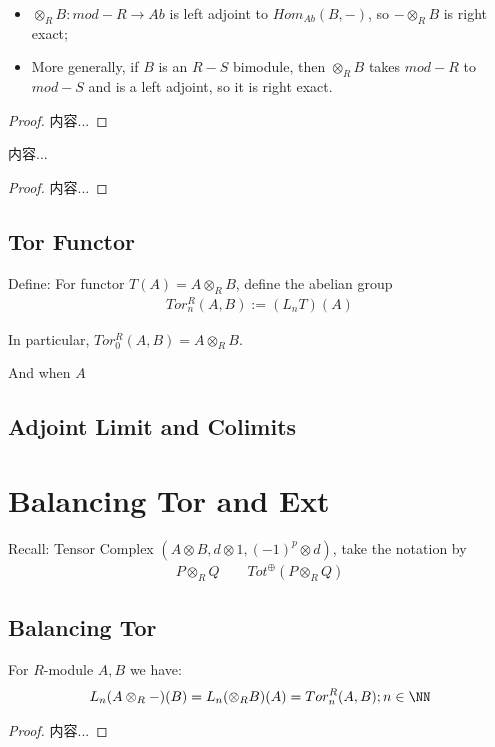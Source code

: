 \documentclass[Total.tex]{subfiles}
\begin{document}
			\begin{corollary}
				\begin{itemize}
				\item $\otimes_R B:mod-R\rightarrow Ab$ is left adjoint to $Hom_{Ab}(B,-)$, so $-\otimes_R B$ is right exact;
				\item More generally, if $B$ is an $R-S$ bimodule, then $\otimes_RB$ takes $mod-R$ to $mod-S$ and is a left adjoint, so it is right exact.
				\end{itemize}
			\end{corollary}
			\begin{proof}
				内容...
			\end{proof}
			
			\begin{proposition}
				内容...
			\end{proposition}
			\begin{proof}
				内容...
			\end{proof}
			\subsection{Tor Functor}
			\begin{Def}
				Define: For functor $T(A)=A\otimes_R B$, define the abelian group
				\begin{gather*}
					Tor^R_n(A,B):=(L_n T)(A)
				\end{gather*}
				
				In particular, $Tor_0^R(A,B)=A\otimes_R B$. 
				
				And when $A$
			\end{Def}
			\subsection{Adjoint Limit and Colimits}
		\section{Balancing Tor and Ext}
			Recall: Tensor Complex $(A\otimes B,d\otimes 1,(-1)^p\otimes d)$, take the notation by
			\begin{gather*}
				P\otimes_R Q\qquad Tot^\oplus(P\otimes_R Q)
			\end{gather*}
			
			\subsection{Balancing Tor}
			\begin{theorem} 
				For $R$-module $A,B$ we have:
				\begin{gather*}
					L_n(A\otimes_R -)(B)=L_n(\otimes_R B)(A)=Tor^R_n(A,B);n\in \NN
				\end{gather*}
			\end{theorem}
			\begin{proof}
				内容...
			\end{proof}
			
\end{document}
